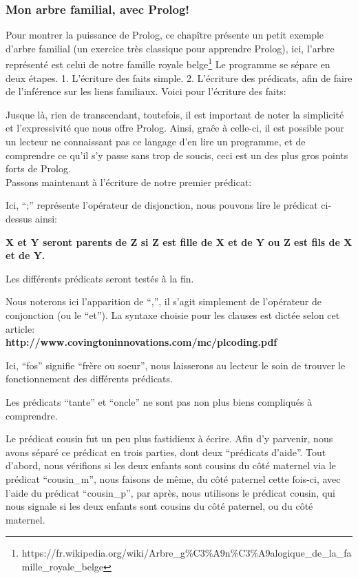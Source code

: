\documentclass[a4paper, 12pt]{article}
\numberwithin{equation}{subsection}
\begin{document}
\subsubsection{Mon arbre familial, avec Prolog!}
Pour montrer la puissance de Prolog, ce chapître présente un petit exemple d'arbre familial (un exercice très classique pour apprendre Prolog), ici, l'arbre représenté est celui de notre famille royale belge\footnote{https://fr.wikipedia.org/wiki/Arbre\_g\%C3\%A9n\%C3\%A9alogique\_de\_la\_famille\_royale\_belge}
Le programme se sépare en deux étapes.
1. L'écriture des faits simple.
2. L'écriture des prédicats, afin de faire de l'inférence sur les liens familiaux.
Voici pour l'écriture des faits:

Jusque là, rien de transcendant, toutefois, il est important de noter la simplicité et l'expressivité que nous offre Prolog. Ainsi, graĉe à celle-ci, il est possible pour un lecteur ne connaissant pas ce langage d'en lire un programme, et de comprendre ce qu'il s'y passe sans trop de soucis, ceci est un des plus gros points forts de Prolog. \\
Passons maintenant à l'écriture de notre premier prédicat:

Ici, ``;'' représente l'opérateur de disjonction, nous pouvons lire le prédicat ci-dessus ainsi:
\begin{center}
  {\bf X et Y seront parents de Z si Z est fille de X et de Y ou Z est fils de X et de Y.}
\end{center}
Les différents prédicats seront testés à la fin.

Nous noterons ici l'apparition de ``,'', il s'agit simplement de l'opérateur de conjonction (ou le ``et''). La syntaxe choisie pour les clauses est dictée selon cet article: \\
{\bf http://www.covingtoninnovations.com/mc/plcoding.pdf}

Ici, ``fos'' signifie ``frère ou soeur'', nous laisserons au lecteur le soin de trouver le fonctionnement des différents prédicats.

Les prédicats ``tante'' et ``oncle'' ne sont pas non plus biens compliqués à comprendre.

Le prédicat cousin fut un peu plus fastidieux à écrire. Afin d'y parvenir, nous avons séparé ce prédicat en trois parties, dont deux ``prédicats d'aide''. Tout d'abord, nous vérifions si les deux enfants sont cousins du côté maternel via le prédicat ``cousin\_m'', nous faisons de même, du côté paternel cette fois-ci, avec l'aide du prédicat ``cousin\_p'', par après, nous utilisons le prédicat cousin, qui nous signale si les deux enfants sont cousins du côté paternel, ou du côté maternel.
\end{document}
